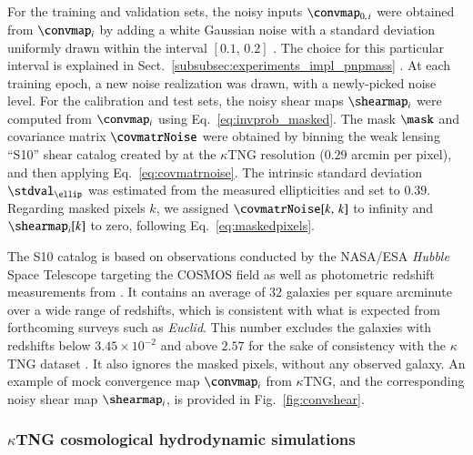 \documentclass{aa}
\begin{document}
For the training and validation sets, the noisy inputs $\convmap_{0,\, i}$ were obtained from $\convmap_i$ by adding a white Gaussian noise with a standard deviation uniformly drawn within the interval $[0.1,\, 0.2]$ . The choice for this particular interval is explained in Sect.~\ref{subsubsec:experiments_impl_pnpmass} \todo. At each training epoch, a new noise realization was drawn, with a newly-picked noise level.
For the calibration and test sets, the noisy shear maps $\shearmap_i$ were computed from $\convmap_i$ using Eq.~\eqref{eq:invprob_masked}. The mask $\mask$ and covariance matrix $\covmatrNoise$ were obtained by binning the weak lensing ``S10'' shear catalog created by \citet{Schrabback2010} at the $\kappa$TNG resolution ($0.29$ arcmin per pixel), and then applying Eq.~\eqref{eq:covmatrnoise}. The intrinsic standard deviation $\stdval_{\ellip}$ was estimated from the measured ellipticities and set to $0.39$. %
Regarding masked pixels $k$, we assigned $\covmatrNoise[k,\, k]$ to infinity and $\shearmap_i[k]$ to zero, following Eq.~\eqref{eq:maskedpixels}.

The S10 catalog is based on observations conducted by the NASA/ESA \textit{Hubble} Space Telescope targeting the COSMOS field \citep{Scoville2007} as well as photometric redshift measurements from \citet{Mobasher2007}. It contains an average of $32$ galaxies per square arcminute over a wide range of redshifts, which is consistent with what is expected from forthcoming surveys such as \textit{Euclid}. This number excludes the galaxies with redshifts below $3.45 \times 10^{-2}$ and above $2.57$ for the sake of consistency with the $\kappa$TNG dataset . It also ignores the masked pixels, without any observed galaxy.
An example of mock convergence map $\convmap_i$ from $\kappa$TNG, and the corresponding noisy shear map $\shearmap_i$, is provided in Fig.~\ref{fig:convshear}.

\subsubsection{$\kappa$TNG cosmological hydrodynamic simulations}
\end{document}
